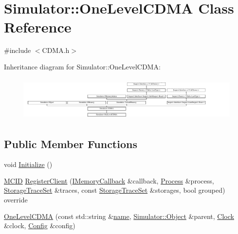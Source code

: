 \hypertarget{class_simulator_1_1_one_level_c_d_m_a}{\section{Simulator\+:\+:One\+Level\+C\+D\+M\+A Class Reference}
\label{class_simulator_1_1_one_level_c_d_m_a}
}


{\ttfamily \#include $<$C\+D\+M\+A.\+h$>$}

Inheritance diagram for Simulator\+:\+:One\+Level\+C\+D\+M\+A\+:\begin{figure}[H]
\begin{center}
\leavevmode
\includegraphics[height=2.301370cm]{class_simulator_1_1_one_level_c_d_m_a}
\end{center}
\end{figure}
\subsection*{Public Member Functions}
\begin{DoxyCompactItemize}
\item 
void \hyperlink{class_simulator_1_1_one_level_c_d_m_a_a5fc9f3341eefcf4f9352db28c8aa2dec}{Initialize} ()
\item 
\hyperlink{namespace_simulator_a4b5747ff30c62c6373badf3b53b9abf7}{M\+C\+I\+D} \hyperlink{class_simulator_1_1_one_level_c_d_m_a_af128c483b45c78b575436f6634d0bc51}{Register\+Client} (\hyperlink{class_simulator_1_1_i_memory_callback}{I\+Memory\+Callback} \&callback, \hyperlink{class_simulator_1_1_process}{Process} \&process, \hyperlink{class_simulator_1_1_storage_trace_set}{Storage\+Trace\+Set} \&traces, const \hyperlink{class_simulator_1_1_storage_trace_set}{Storage\+Trace\+Set} \&storages, bool grouped) override
\item 
\hyperlink{class_simulator_1_1_one_level_c_d_m_a_a9a15e923eda587c0104b31678423e1a8}{One\+Level\+C\+D\+M\+A} (const std\+::string \&\hyperlink{mtconf_8c_a8f8f80d37794cde9472343e4487ba3eb}{name}, \hyperlink{class_simulator_1_1_object}{Simulator\+::\+Object} \&parent, \hyperlink{class_simulator_1_1_clock}{Clock} \&clock, \hyperlink{class_config}{Config} \&config)
\end{DoxyCompactItemize}

